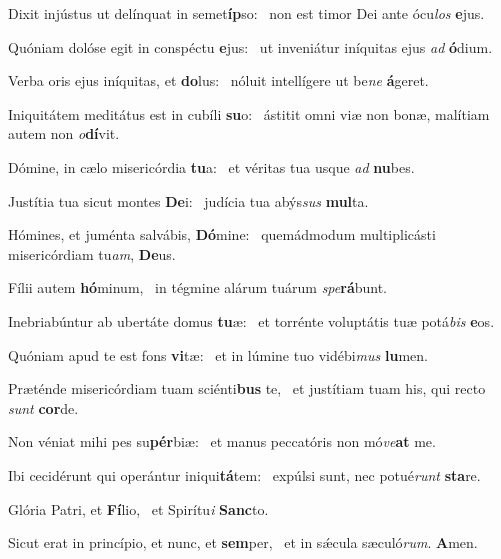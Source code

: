 \item Dixit injústus ut delínquat in semet\textbf{íp}so:~\psstar{} non est timor Dei ante ócu\textit{los} \textbf{e}jus.
\item Quóniam dolóse egit in conspéctu \textbf{e}jus:~\psstar{} ut inveniátur iníquitas ejus \textit{ad} \textbf{ó}dium.
\item Verba oris ejus iníquitas, et \textbf{do}lus:~\psstar{} nóluit intellígere ut be\textit{ne} \textbf{á}geret.
\item Iniquitátem meditátus est in cubíli \textbf{su}o:~\psstar{} ástitit omni viæ non bonæ, malítiam autem non \textit{o}\textbf{dí}vit.
\item Dómine, in cælo misericórdia \textbf{tu}a:~\psstar{} et véritas tua usque \textit{ad} \textbf{nu}bes.
\item Justítia tua sicut montes \textbf{De}i:~\psstar{} judícia tua abýs\textit{sus} \textbf{mul}ta.
\item Hómines, et juménta salvábis, \textbf{Dó}mine:~\psstar{} quemádmodum multiplicásti misericórdiam tu\textit{am}, \textbf{De}us.
\item Fílii autem \textbf{hó}minum,~\psstar{} in tégmine alárum tuárum \textit{spe}\textbf{rá}bunt.
\item Inebriabúntur ab ubertáte domus \textbf{tu}æ:~\psstar{} et torrénte voluptátis tuæ potá\textit{bis} \textbf{e}os.
\item Quóniam apud te est fons \textbf{vi}tæ:~\psstar{} et in lúmine tuo vidébi\textit{mus} \textbf{lu}men.
\item Præténde misericórdiam tuam sciénti\textbf{bus} te,~\psstar{} et justítiam tuam his, qui recto \textit{sunt} \textbf{cor}de.
\item Non véniat mihi pes su\textbf{pér}biæ:~\psstar{} et manus peccatóris non mó\textit{ve}\textbf{at} me.
\item Ibi cecidérunt qui operántur iniqui\textbf{tá}tem:~\psstar{} expúlsi sunt, nec potué\textit{runt} \textbf{sta}re.
\item Glória Patri, et \textbf{Fí}lio,~\psstar{} et Spirítu\textit{i} \textbf{Sanc}to.
\item Sicut erat in princípio, et nunc, et \textbf{sem}per,~\psstar{} et in sǽcula sæculó\textit{rum}. \textbf{A}men.